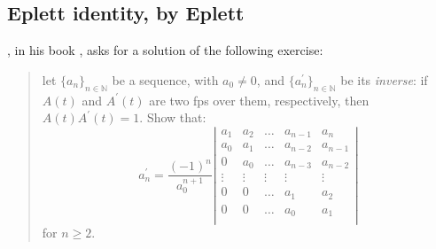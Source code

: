 
\subsection{Eplett identity, by Eplett}

\citeauthor{riordan:intro:combinatorial:analysis},
in his book \cite{riordan:intro:combinatorial:analysis},
asks for a solution of the following exercise:

\begin{quote}
    let $\lbrace a_{n} \rbrace_{n\in\mathbb{N}}$ be a sequence, with $a_{0}\neq0$, 
    and $\lbrace a_{n}^{\prime} \rbrace_{n\in\mathbb{N}}$ be its \emph{inverse}:
    if $A(t)$ and $A^{\prime}(t)$ are two \ac{fps} over them, respectively, 
    then $A(t)A^{\prime}(t)=1$. Show that:
    \begin{displaymath}                
        a_{n}^{\prime} = \frac{(-1)^{n}}{a_{0}^{n+1}}
            \left|
            \begin{array}{ccccc}
                a_1 & a_2 & \ldots & a_{n-1} & a_{n}\\
                a_0 & a_1 & \ldots & a_{n-2} & a_{n-1}\\
                0   & a_0 & \ldots & a_{n-3} & a_{n-2}\\
                \vdots & \vdots & \vdots & \vdots & \vdots\\
                0 & 0 & \ldots & a_{1} & a_{2}\\
                0 & 0 & \ldots & a_{0} & a_{1}\\
            \end{array}
            \right|
    \end{displaymath}                
    for $n \geq 2$.
\end{quote}

